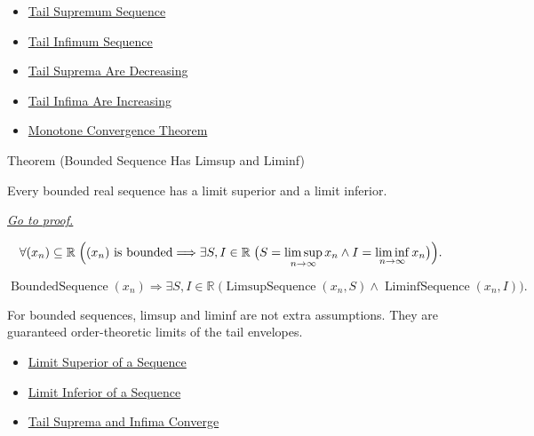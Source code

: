 \begin{dependencies}
\begin{itemize}
  \item \hyperref[def:tail-supremum-sequence]{Tail Supremum Sequence}
  \item \hyperref[def:tail-infimum-sequence]{Tail Infimum Sequence}
  \item \hyperref[thm:tail-suprema-are-decreasing]{Tail Suprema Are Decreasing}
  \item \hyperref[thm:tail-infima-are-increasing]{Tail Infima Are Increasing}
  \item \hyperref[thm:monotone-convergence-theorem]{Monotone Convergence Theorem}
\end{itemize}
\end{dependencies}


\begin{theorembox}{Theorem (Bounded Sequence Has Limsup and Liminf)}
\begin{theorem}
\label{thm:bounded-sequence-has-limsup-and-liminf}
Every bounded real sequence has a limit superior and a limit inferior.

\smallskip
\noindent
\hyperref[prf:bounded-sequence-has-limsup-and-liminf]{\textit{Go to proof.}}
\end{theorem}
\end{theorembox}

\begin{remark*}
\[
\forall (x_n)\subseteq\mathbb{R}\;
\Bigl(
  (x_n)\text{ is bounded}
  \Longrightarrow
  \exists S,I\in\mathbb{R}\;
  \bigl(S=\limsup_{n\to\infty}x_n
  \land I=\liminf_{n\to\infty}x_n\bigr)
\Bigr).
\]
\end{remark*}

\begin{remark*}
\[
\operatorname{BoundedSequence}(x_n)
\Longrightarrow
\exists S,I\in\mathbb{R}\;
\bigl(
  \operatorname{LimsupSequence}(x_n,S)
  \land
  \operatorname{LiminfSequence}(x_n,I)
\bigr).
\]
\end{remark*}

\begin{remark*}[Interpretation]
For bounded sequences, limsup and liminf are not extra assumptions. They are
guaranteed order-theoretic limits of the tail envelopes.
\end{remark*}

\begin{dependencies}
\begin{itemize}
  \item \hyperref[def:limsup-sequence]{Limit Superior of a Sequence}
  \item \hyperref[def:liminf-sequence]{Limit Inferior of a Sequence}
  \item \hyperref[thm:tail-suprema-and-infima-converge]{Tail Suprema and Infima Converge}
\end{itemize}
\end{dependencies}